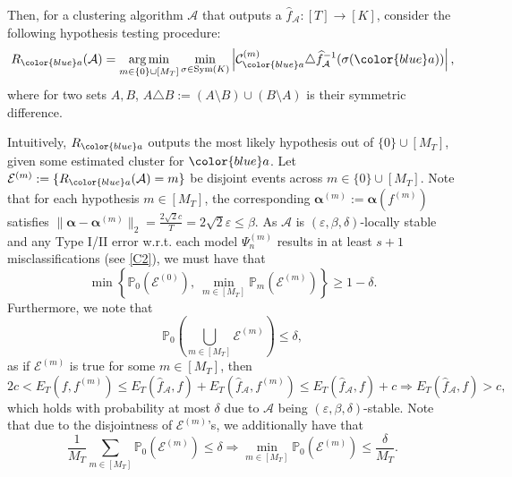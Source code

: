\documentclass[twoside]{article}
\def\gA{{\mathcal{A}}}
\def\gC{{\mathcal{C}}}
\def\gE{{\mathcal{E}}}
\def\sP{{\mathbb{P}}}
\DeclareMathOperator*{\argmin}{arg\,min}
\theoremstyle{plain}
\newcommand{\Sym}{\mathrm{Sym}}
\begin{document}
Then, for a clustering algorithm $\gA$ that outputs a $\widehat{f}_\gA : [T] \rightarrow [K]$, consider the following hypothesis testing procedure:
\begin{equation}
    R_{\color{blue} a}(\gA) = \argmin_{m \in \{0\} \cup [M_T]} \min_{\sigma \in \Sym(K)} \left| \gC_{\color{blue} a}^{(m)} \triangle \widehat{f}_\gA^{-1}(\sigma({\color{blue} a})) \right|,
\end{equation}
where for two sets $A, B$, $A \triangle B := (A \setminus B) \cup (B \setminus A)$ is their symmetric difference.

Intuitively, $R_{\color{blue} a}$ outputs the most likely hypothesis out of $\{0\} \cup [M_T]$, given some estimated cluster for ${\color{blue} a}$.
Let $\gE^{(m)} := \{ R_{\color{blue} a}(\gA) = m \}$ be disjoint events across $m \in \{0\} \cup [M_T]$.
Note that for each hypothesis $m \in [M_T]$, the corresponding $\bm\alpha^{(m)} := \bm\alpha(f^{(m)})$ satisfies $\lVert \bm\alpha - \bm\alpha^{(m)} \rVert_2 = \frac{2\sqrt{2} c}{T} = 2\sqrt{2}\varepsilon \leq \beta$.
As $\gA$ is $(\varepsilon, \beta, \delta)$-locally stable and any Type I/II error w.r.t. each model $\Psi_n^{(m)}$ results in at least $s + 1$ misclassifications (see \ref{C2}), we must have that
\begin{equation}
\label{eqn:stable}
    \min\left\{ \sP_0\left( \gE^{(0)} \right), \ \min_{m \in [M_T]} \sP_m\left( \gE^{(m)} \right) \right\} \geq 1 - \delta.
\end{equation}
Furthermore, we note that
\begin{equation}
\label{eqn:inclusion}
    \sP_0 \left( \bigcup_{m \in [M_T]} \gE^{(m)} \right) \leq \delta,
\end{equation}
as if $\gE^{(m)}$ is true for some $m \in [M_T]$, then
\begin{equation*}
    2c < E_T(f, f^{(m)}) \leq E_T(\widehat{f}_\gA, f) + E_T(\widehat{f}_\gA, f^{(m)})
    \leq E_T(\widehat{f}_\gA, f) + c \Longrightarrow E_T(\widehat{f}_\gA, f) > c,
\end{equation*}
which holds with probability at most $\delta$ due to $\gA$ being $(\varepsilon, \beta, \delta)$-stable.
Note that due to the disjointness of $\gE^{(m)}$'s, we additionally have that
\begin{equation}
\label{eqn:min-prob}
    \frac{1}{M_T} \sum_{m \in [M_T]} \sP_0 \left( \gE^{(m)} \right) \leq \delta
    \Longrightarrow \min_{m \in [M_T]} \sP_0 \left( \gE^{(m)} \right) \leq \frac{\delta}{M_T}.
\end{equation}
\end{document}
